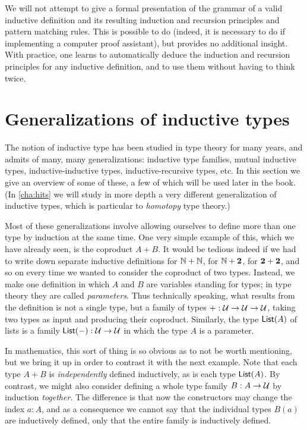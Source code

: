 We will not attempt to give a formal presentation of the grammar of a valid inductive definition and its resulting induction and recursion principles and pattern matching rules.
This is possible to do (indeed, it is necessary to do if implementing a computer proof assistant), but provides no additional insight.
With practice, one learns to automatically deduce the induction and recursion principles for any inductive definition, and to use them without having to think twice.



\section{Generalizations of inductive types}
\label{sec:generalizations}

The notion of inductive type has been studied in type theory for many years, and admits of many, many generalizations: inductive type families, mutual inductive types, inductive-inductive types, inductive-recursive types, etc.
In this section we give an overview of some of these, a few of which will be used later in the book.
(In \autoref{cha:hits} we will study in more depth a very different generalization of inductive types, which is particular to \emph{homotopy} type theory.)

Most of these generalizations involve allowing ourselves to define more than one type by induction at the same time.
One very simple example of this, which we have already seen, is the coproduct $A+B$.
It would be tedious indeed if we had to write down separate inductive definitions for $\mathbb{N}+\mathbb{N}$, for $\mathbb{N}+\mathbf{2}$, for $\mathbf{2}+\mathbf{2}$, and so on every time we wanted to consider the coproduct of two types.
Instead, we make one definition in which $A$ and $B$ are variables standing for types; in type theory they are called \emph{parameters}.
Thus technically speaking, what results from the definition is not a single type, but a family of types $+ : \mathcal{U}\to\mathcal{U}\to\mathcal{U}$, taking two types as input and producing their coproduct.
Similarly, the type $\mathsf{List}(A)$ of lists is a family $\mathsf{List}(-):\mathcal{U}\to\mathcal{U}$ in which the type $A$ is a parameter.

In mathematics, this sort of thing is so obvious as to not be worth mentioning, but we bring it up in order to contrast it with the next example.
Note that each type $A+B$ is \emph{independently} defined inductively, as is each type $\mathsf{List}(A)$.
By contrast, we might also consider defining a whole type family $B:A\to\mathcal{U}$ by induction \emph{together}.
The difference is that now the constructors may change the index $a:A$, and as a consequence we cannot say that the individual types $B(a)$ are inductively defined, only that the entire family is inductively defined.

